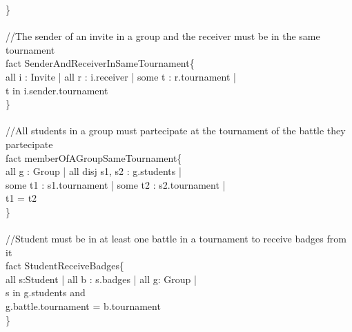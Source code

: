 \documentclass{article}
\begin{document}
{\}\\
\\
\color{gray}
//The sender of an invite in a group and the receiver must be in the same tournament\\
\color{black}
\color{blue} fact \color{black} SenderAndReceiverInSameTournament\{\\
\-\hspace{1cm} \color{blue} all \color{black} i : Invite | \color{blue} all \color{black} r : i.receiver |  \color{blue} some \color{black} t : r.tournament | \\
\-\hspace{1cm} t \color{blue} in \color{black} i.sender.tournament\\
\}\\
\\
\color{gray}
//All students in a group must partecipate at the tournament of the battle they partecipate\\
\color{black}
\color{blue} fact \color{black} memberOfAGroupSameTournament\{\\
\-\hspace{1cm} \color{blue} all \color{black} g : Group | \color{blue} all disj \color{black} s1, s2 : g.students | \\
\-\hspace{1cm} \color{blue} some \color{black} t1 : s1.tournament | \color{blue} some \color{black} t2 : s2.tournament | \\
\-\hspace{1cm} t1 \color{blue} = \color{black} t2\\
\}\\
\\
\color{gray}
//Student must be in at least one battle in a tournament to receive badges from it\\
\color{black}
\color{blue} fact \color{black} StudentReceiveBadges\{\\
\-\hspace{1cm} \color{blue} all \color{black} s:Student | \color{blue} all \color{black} b : s.badges | \color{blue} all \color{black} g: Group |  \\
\-\hspace{1cm} s \color{blue} in \color{black} g.students and    \\
\-\hspace{1cm} g.battle.tournament \color{blue} = \color{black} b.tournament\\
\}\\
\\
\color{gray}
}
\end{document}
